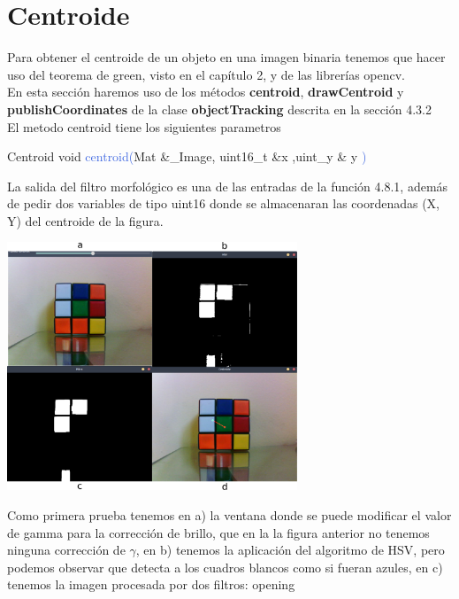 \section{Centroide}
Para obtener el centroide de un objeto en una imagen binaria tenemos que hacer uso del
teorema de green, visto en el capítulo 2, y de las librerías opencv.\\
En esta sección haremos uso de los métodos \textbf{centroid}, \textbf{drawCentroid} y \textbf{publishCoordinates} de la clase
\textbf{objectTracking} descrita en la sección 4.3.2\\
El metodo centroid tiene los siguientes parametros
\begin{example}[label={ex:serie}]{Centroid}
	\textcolor{Mulberry}{void} \textcolor{RoyalBlue}{centroid(}\textcolor{BurntOrange}{Mat}
	\textcolor{Mulberry}{\&}\textcolor{Bittersweet}{\_Image}, \textcolor{BurntOrange}{uint16\_t} \textcolor{Mulberry}{\&}\textcolor{Bittersweet}{x}
	,\textcolor{BurntOrange}{uint\_y} \textcolor{Mulberry}{\&} \textcolor{Bittersweet}{y}
	\textcolor{RoyalBlue}{)}
\end{example}
La salida del filtro morfológico es una de las entradas de la función 4.8.1, además de pedir dos variables de tipo uint16 donde
se almacenaran las coordenadas (X, Y) del centroide de la figura.
\begin{center}
	\includegraphics[width=0.65\textwidth]{Contenido/Cuerpo/Capitulo4/Fig25.eps}
	\label{Fig9}
\end{center}
Como primera prueba tenemos en a) la ventana donde se puede modificar el valor de gamma para la corrección de brillo, que en la
la figura anterior no tenemos ninguna corrección de $\gamma$, en b) tenemos la aplicación del algoritmo de HSV, pero podemos
observar que detecta a los cuadros blancos como si fueran azules, en c) tenemos la imagen procesada por dos filtros: opening
